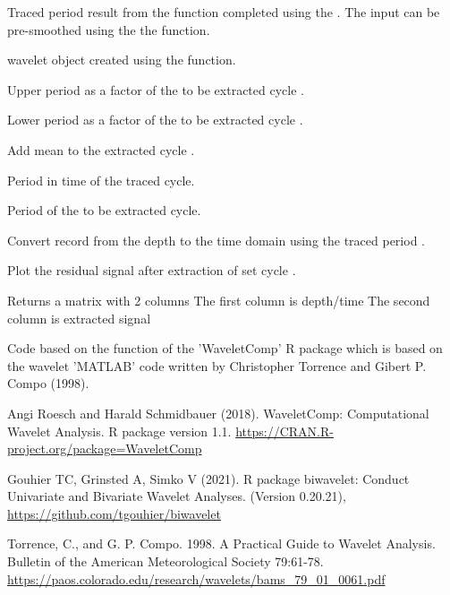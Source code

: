 \documentclass[a4paper]{book}
\begin{document}
\begin{Arguments}
\begin{ldescription}
\item[\code{tracked\_cycle\_curve}] Traced period result from the 
function completed using the .
The input can be pre-smoothed using the the  function.

\item[\code{wavelet}] wavelet object created using the  function.

\item[\code{period\_up}] Upper period as a factor of the to be extracted cycle .

\item[\code{period\_down}] Lower period as a factor of the to be extracted cycle .

\item[\code{add\_mean}] Add mean to the extracted cycle .

\item[\code{tracked\_cycle\_period}] Period in time of the traced cycle.

\item[\code{extract\_cycle}] Period of the to be extracted cycle.

\item[\code{tune}] Convert record from the depth to the time domain using the traced period .

\item[\code{plot\_residual}] Plot the residual signal after extraction of set cycle .
\end{ldescription}
\end{Arguments}
%
\begin{Value}
Returns a matrix with 2 columns
The first column is depth/time
The second column is extracted signal
\end{Value}
%
\begin{Author}
Code based on the  function of the 'WaveletComp' R package
which is based on the wavelet 'MATLAB' code written by Christopher Torrence and Gibert P. Compo (1998).
\end{Author}
%
\begin{References}
Angi Roesch and Harald Schmidbauer (2018). WaveletComp: Computational
Wavelet Analysis. R package version 1.1.
\url{https://CRAN.R-project.org/package=WaveletComp}

Gouhier TC, Grinsted A, Simko V (2021). R package biwavelet: Conduct Univariate and Bivariate Wavelet Analyses. (Version 0.20.21),
\url{https://github.com/tgouhier/biwavelet}

Torrence, C., and G. P. Compo. 1998. A Practical Guide to Wavelet Analysis.
Bulletin of the American Meteorological Society 79:61-78.
\url{https://paos.colorado.edu/research/wavelets/bams_79_01_0061.pdf}
\end{References}
\end{document}
